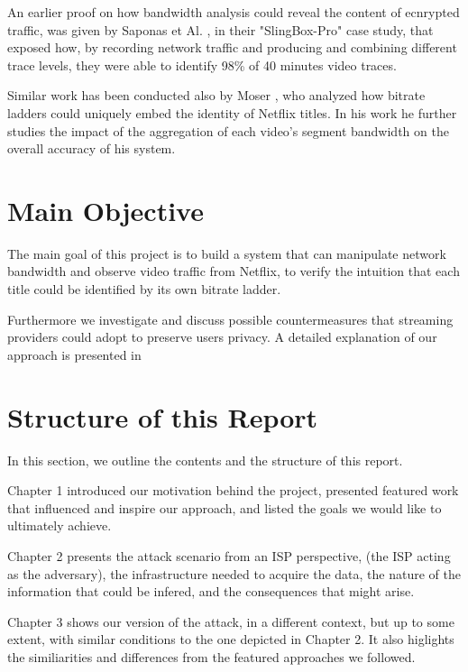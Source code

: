 An earlier proof on how bandwidth analysis could reveal the content of
ecnrypted traffic, was given by Saponas et Al. \cite{Saponas2007devices}, in
their "SlingBox-Pro" case study, that exposed how, by recording network traffic
and producing and combining different trace levels, they were able to identify
98\% of 40 minutes video traces.

Similar work has been conducted also by Moser \cite{moser}, who analyzed how
bitrate ladders could uniquely embed the identity of Netflix titles. In his
work he further studies the impact of the aggregation of each video's segment
bandwidth on the overall accuracy of his system. 

\section{Main Objective}\label{sec:objective}

The main goal of this project is to build a system that can manipulate network
bandwidth and observe video traffic from Netflix, to verify the intuition that
each title could be identified by its own bitrate ladder. 

Furthermore we investigate and discuss possible countermeasures that streaming
providers could adopt to preserve users privacy. A detailed explanation of our
approach is presented in 

\section{Structure of this Report}\label{sec:structure}
  
In this section, we outline the contents and the structure of this report.

Chapter 1 introduced our motivation behind the project, presented featured work
that influenced and inspire our approach, and listed the goals we would like to
ultimately achieve.

Chapter 2 presents the attack scenario from an ISP perspective, (the ISP acting
as the adversary), the infrastructure needed to acquire the data, the nature of
the information that could be infered, and the consequences that might arise.

Chapter 3 shows our version of the attack, in a different context, but up to
some extent, with similar conditions to the one depicted in Chapter 2. It also
higlights the similiarities and differences from the featured approaches we
followed.

